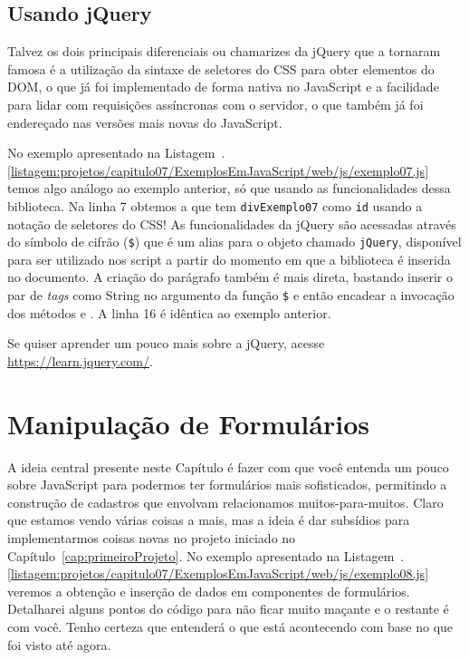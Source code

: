 

\subsection{Usando jQuery}

Talvez os dois principais diferenciais ou chamarizes da jQuery que a tornaram famosa é a utilização da sintaxe de seletores do CSS para obter elementos do DOM, o que já foi implementado de forma nativa no JavaScript e a facilidade para lidar com requisições assíncronas com o servidor, o que também já foi endereçado nas versões mais novas do JavaScript.

No exemplo apresentado na Listagem~\thechapter.\ref{listagem:projetos/capitulo07/ExemplosEmJavaScript/web/js/exemplo07.js} temos algo análogo ao exemplo anterior, só que usando as funcionalidades dessa biblioteca. Na linha 7 obtemos a  que tem \texttt{divExemplo07} como \texttt{id} usando a notação de seletores do CSS! As funcionalidades da jQuery são acessadas através do símbolo de cifrão (\texttt{\$}) que é um alias para o objeto chamado \texttt{jQuery}, disponível para ser utilizado nos script a partir do momento em que a biblioteca é inserida no documento. A criação do parágrafo também é mais direta, bastando inserir o par de \textit{tags} como String no argumento da função \texttt{\$} e então encadear a invocação dos métodos  e . A linha 16 é idêntica ao exemplo anterior.


\begin{saibaMais}
    Se quiser aprender um pouco mais sobre a jQuery, acesse \url{https://learn.jquery.com/}.
\end{saibaMais}



\section{Manipulação de Formulários}

A ideia central presente neste Capítulo é fazer com que você entenda um pouco sobre JavaScript para podermos ter formulários mais sofisticados, permitindo a construção de cadastros que envolvam relacionamos muitos-para-muitos. Claro que estamos vendo várias coisas a mais, mas a ideia é dar subsídios para implementarmos coisas novas no projeto iniciado no Capítulo~\ref{cap:primeiroProjeto}. No exemplo apresentado na Listagem~\thechapter.\ref{listagem:projetos/capitulo07/ExemplosEmJavaScript/web/js/exemplo08.js} veremos a obtenção e inserção de dados em componentes de formulários. Detalharei alguns pontos do código para não ficar muito maçante e o restante é com você. Tenho certeza que entenderá o que está acontecendo com base no que foi visto até agora.

